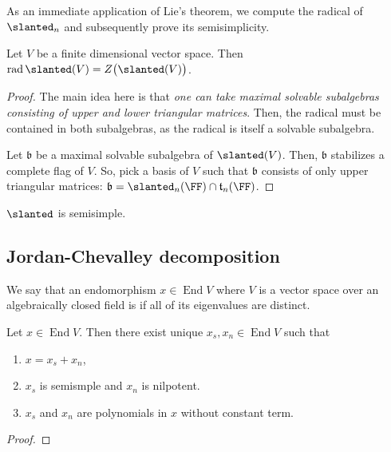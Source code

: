 \documentclass{article}
\DeclareMathOperator{\End}{End}
\DeclareMathOperator{\rad}{rad}
\newcommand*\frkb{{\ensuremath{\mathfrak{b}}}}
\let\sl\slanted
\newcommand*\sl{\ensuremath{\mathfrak{sl}}}
\newcommand*\talg{\ensuremath{\mathfrak{t}}}
\begin{document}
As an immediate application of Lie's theorem, we compute the radical of $\sl_n$ and subsequently prove its semisimplicity.

\begin{proposition}
    \cite[Exercise 4.1]{Hum72}
    Let $V$ be a finite dimensional vector space.
    Then $\rad \sl(V) = Z\big(\sl(V)\big)$.
\end{proposition}

\begin{proof}
    The main idea here is that \textit{one can take maximal solvable subalgebras consisting of upper and lower triangular matrices}.
    Then, the radical must be contained in both subalgebras, as the radical is itself a solvable subalgebra.

    Let $\frkb$ be a maximal solvable subalgebra of $\sl(V)$.
    Then, $\frkb$ stabilizes a complete flag of $V$.
    So, pick a basis of $V$ such that $\frkb$ consists of only upper triangular matrices: $\frkb = \sl_n(\FF) \cap \talg_n(\FF)$.
\end{proof}

\begin{corollary}
    $\sl$ is semisimple.
\end{corollary}

\subsection{Jordan-Chevalley decomposition}

We say that an endomorphism $x \in \End V$ where $V$ is a vector space over an algebraically closed field is  if all of its eigenvalues are distinct.

\begin{theorem}
    \label{thm:JordanChevalley}
    Let $x \in \End V$.
    Then there exist unique $x_s, x_n \in \End V$ such that
    \begin{enumerate}[label=(\alph*)]
        \item 
            $x = x_s + x_n$,
        \item 
            $x_s$ is semismple and $x_n$ is nilpotent.
        \item 
            $x_s$ and $x_n$ are polynomials in $x$ without constant term.
    \end{enumerate}
\end{theorem}

\begin{proof}
\end{proof}
\end{document}
